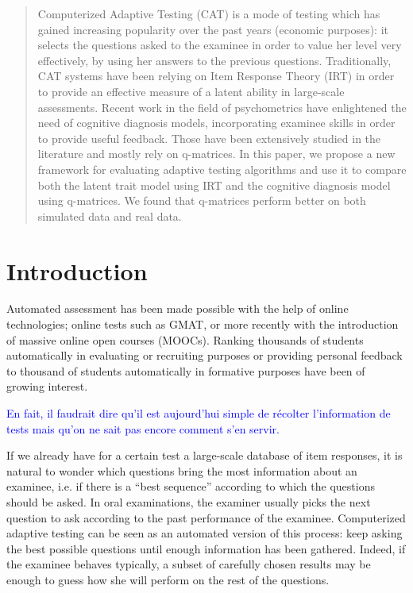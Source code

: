 \documentclass{sig-alternate}
\newcommand\note[1]{\textcolor{blue}{#1}}
\begin{document}
\maketitle
\begin{abstract}
Computerized Adaptive Testing (CAT) is a mode of testing which has gained increasing popularity over the past years (economic purposes): it selects the questions asked to the examinee in order to value her level very effectively, by using her answers to the previous questions.
Traditionally, CAT systems have been relying on Item Response Theory (IRT) in order to provide an effective measure of a latent ability in large-scale assessments.
Recent work in the field of psychometrics have enlightened the need of cognitive diagnosis models, incorporating examinee skills in order to provide useful feedback. Those have been extensively studied in the literature and mostly rely on q-matrices.
In this paper, we propose a new framework for evaluating adaptive testing algorithms and use it to compare both the latent trait model using IRT and the cognitive diagnosis model using q-matrices.
We found that q-matrices perform better on both simulated data and real data.
\end{abstract}




\section{Introduction}
Automated assessment has been made possible with the help of online technologies; online tests such as GMAT, or more recently with the introduction of massive online open courses (MOOCs). Ranking thousands of students automatically in evaluating or recruiting purposes or providing personal feedback to thousand of students automatically in formative purposes have been of growing interest.

\note{En fait, il faudrait dire qu'il est aujourd'hui simple de récolter l'information de tests mais qu'on ne sait pas encore comment s'en servir.}

If we already have for a certain test a large-scale database of item responses, it is natural to wonder which questions bring the most information about an examinee, i.e. if there is a ``best sequence'' according to which the questions should be asked. In oral examinations, the examiner usually picks the next question to ask according to the past performance of the examinee. Computerized adaptive testing can be seen as an automated version of this process: keep asking the best possible questions until enough information has been gathered. Indeed, if the examinee behaves typically, a subset of carefully chosen results may be enough to guess how she will perform on the rest of the questions.
\end{document}
